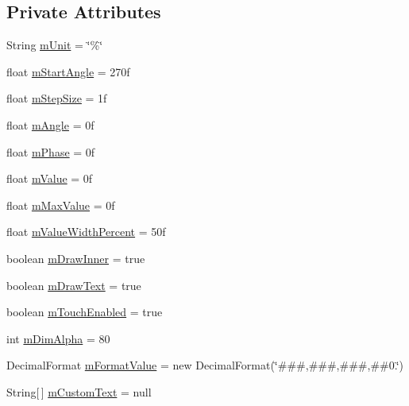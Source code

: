 \subsection*{Private Attributes}
\begin{DoxyCompactItemize}
\item 
String \hyperlink{classcs_1_1nsense_1_1_circle_display_ac945e1cfc35dacdcb6ccbc99b0eca67d}{m\-Unit} = \char`\"{}\%\char`\"{}
\item 
float \hyperlink{classcs_1_1nsense_1_1_circle_display_aea2263400339123d153c5a097a5784de}{m\-Start\-Angle} = 270f
\item 
float \hyperlink{classcs_1_1nsense_1_1_circle_display_ae39f44599a59bbcd082589e4f75eaf9f}{m\-Step\-Size} = 1f
\item 
float \hyperlink{classcs_1_1nsense_1_1_circle_display_a314374d5fec0880ef39aedeaa926f837}{m\-Angle} = 0f
\item 
float \hyperlink{classcs_1_1nsense_1_1_circle_display_acd03c2fef87214cee07a6e4616a220a9}{m\-Phase} = 0f
\item 
float \hyperlink{classcs_1_1nsense_1_1_circle_display_a2992f519bc078e9f182ae02ce303ae88}{m\-Value} = 0f
\item 
float \hyperlink{classcs_1_1nsense_1_1_circle_display_aeec061c6a120fbc4cb6751f45056bf06}{m\-Max\-Value} = 0f
\item 
float \hyperlink{classcs_1_1nsense_1_1_circle_display_ae8ada5da75894dde3b3e14579b3f447c}{m\-Value\-Width\-Percent} = 50f
\item 
boolean \hyperlink{classcs_1_1nsense_1_1_circle_display_a7963ce908095f857dabb9d8020d1df21}{m\-Draw\-Inner} = true
\item 
boolean \hyperlink{classcs_1_1nsense_1_1_circle_display_a07b4d929124b30c8fc453ac0b0e17d70}{m\-Draw\-Text} = true
\item 
boolean \hyperlink{classcs_1_1nsense_1_1_circle_display_ad66f0833e4072a0e0db4668fe24c351b}{m\-Touch\-Enabled} = true
\item 
int \hyperlink{classcs_1_1nsense_1_1_circle_display_ad99963b0e3b50d420b6137c003976399}{m\-Dim\-Alpha} = 80
\item 
Decimal\-Format \hyperlink{classcs_1_1nsense_1_1_circle_display_a46e340a951601dc18e47b5f0979d862e}{m\-Format\-Value} = new Decimal\-Format(\char`\"{}\#\#\#,\#\#\#,\#\#\#,\#\#0.\char`\"{})
\item 
String\mbox{[}$\,$\mbox{]} \hyperlink{classcs_1_1nsense_1_1_circle_display_a604278e27ef7d368ba3a941ac49f44e8}{m\-Custom\-Text} = null
\item 

\end{DoxyCompactItemize}

